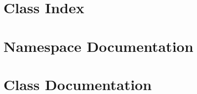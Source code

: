 \documentclass[twoside]{book}
\newcommand{\+}{\discretionary{\mbox{\scriptsize$\hookleftarrow$}}{}{}}
\newcommand{\clearemptydoublepage}{%
    \newpage{\pagestyle{empty}\cleardoublepage}%
  }
\begin{document}
\chapter{Class Index}

\chapter{Namespace Documentation}






\chapter{Class Documentation}










  \backmatter
  \newpage
  \clearemptydoublepage
  \printindex
\end{document}
